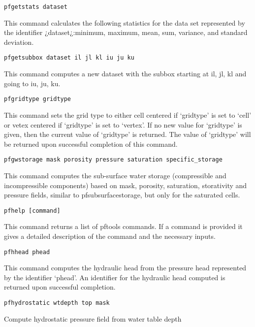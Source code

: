 \begin{description}
\item{\begin{verbatim}pfgetstats dataset\end{verbatim}}
This command calculates the following statistics for the data set represented by the 
identifier ¿dataset¿:minimum, maximum, mean, sum, variance, and standard deviation. 

\item{\begin{verbatim}pfgetsubbox dataset il jl kl iu ju ku\end{verbatim}}
This command computes a new dataset with the subbox starting at il, jl, kl and going to iu, ju, ku.
    

\item{\begin{verbatim}pfgridtype gridtype\end{verbatim}}
This command sets the grid type to either cell centered if `gridtype'
is set to `cell' or vetex centered if `gridtype' is set to `vertex'.
If no new value for `gridtype' is given, then the current value of
`gridtype' is returned.  The value of `gridtype' will be returned upon
successful completion of this command.


\item{\begin{verbatim}pfgwstorage mask porosity pressure saturation specific_storage\end{verbatim}}
This command computes the sub-surface water storage (compressible and incompressible components) 
based on mask, porosity, saturation, storativity and pressure fields, similar to pfsubsurfacestorage,
but only for the saturated cells. 

\item{\begin{verbatim}pfhelp [command]\end{verbatim}}
This command returns a list of pftools commands. If a command is provided it gives a detailed
description of the command and the necessary inputs. 

\item{\begin{verbatim}pfhhead phead\end{verbatim}}
This command computes the hydraulic head from the pressure head       
represented by the identifier `phead'.  An identifier for the 
hydraulic head computed is returned upon successful completion.

\item{\begin{verbatim}pfhydrostatic wtdepth top mask\end{verbatim}}
Compute hydrostatic pressure field from water table depth


\end{description}
